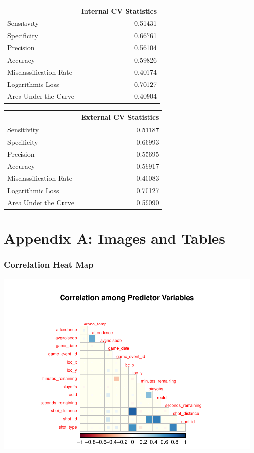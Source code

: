 \documentclass[american,]{article}
\begin{document}
\pagebreak
\begin{table}

\centering
\begin{tabular}{lr}
\toprule
  & Internal CV Statistics\\
\midrule
Sensitivity & 0.51431\\
Specificity & 0.66761\\
Precision & 0.56104\\
Accuracy & 0.59826\\
Misclassification Rate & 0.40174\\
\addlinespace
Logarithmic Loss & 0.70127\\
Area Under the Curve & 0.40904\\
\bottomrule
\end{tabular}
\centering
\begin{tabular}{lr}
\toprule
  & External CV Statistics\\
\midrule
Sensitivity & 0.51187\\
Specificity & 0.66993\\
Precision & 0.55695\\
Accuracy & 0.59917\\
Misclassification Rate & 0.40083\\
\addlinespace
Logarithmic Loss & 0.70127\\
Area Under the Curve & 0.59090\\
\bottomrule
\end{tabular}
\end{table}
\newpage

\newpage

\hypertarget{appendix-a-images-and-tables}{%
\section{Appendix A: Images and Tables}\label{appendix-a-images-and-tables}}

\hypertarget{correlation-heat-map}{%
\subsubsection{Correlation Heat Map}\label{correlation-heat-map}}

\includegraphics{Final_Project_Applied_files/figure-latex/Heatmap for Appendix-1.pdf}
\end{document}
